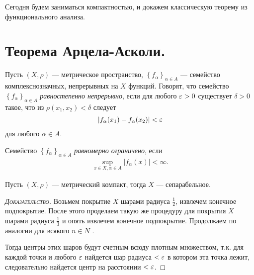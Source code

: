 \documentclass[../complex-analysis.tex]{subfiles}
\begin{document}
 Сегодня будем заниматься компактностью, и докажем классическую теорему из функционального анализа.

 \newpage
 \section{Теорема Арцела-Асколи.}

 \begin{df}
  Пусть $ (X,\rho) $ --- метрическое пространство, $ \left\{f_\alpha\right\}_{\alpha \in A}  $ --- семейство комплекснозначных, непрерывных на $ X $ функций. Говорят, что семейство $ \left\{f_\alpha\right\}_{\alpha\in A}  $ \textit{равностепенно непрерывно}, если для любого $ \varepsilon > 0 $ существует $ \delta > 0 $ такое, что из $ \rho(x_1, x_2) < \delta $ следует
  \begin{align}
	  \left|f_\alpha(x_1) - f_\alpha(x_2) \right| < \varepsilon \label{eq:equicontinuity}
  \end{align} для любого $ \alpha \in A $.
 \end{df}
 \begin{df}
  Семейство $ \left\{f_\alpha\right\}_{\alpha \in A}  $ \textit{равномерно ограничено}, если
  \begin{align*}
   \sup_{x \in X, \alpha \in A} \left| f_\alpha(x) \right| < \infty.
  \end{align*}
 \end{df}

 \begin{lm}
	 \label{lemma:metric_compact_is_seperable_space}
 	Пусть $(X, \rho)$ --- метрический компакт, тогда $X$ --- сепарабельное.
 \end{lm}

 \begin{proof}[\normalfont\textsc{Доказательство}]
	 Возьмем покрытие $X$ шарами радиуса $\frac{1}{2}$, извлечем конечное подпокрытие.
	 После этого проделаем такую же процедуру для покрытия $X$ шарами радиуса $\frac{1}{3}$  и опять извлечем конечное подпокрытие.
	 Продолжаем по аналогии для всякого $n \in N$ .

	 Тогда центры этих шаров будут счетным всюду плотным множеством, т.к. для каждой точки и любого $\varepsilon$ найдется шар радиуса $< \varepsilon$ в котором эта точка лежит, следовательно найдется центр на расстоянии $< \varepsilon$. 
 \end{proof}
\end{document}
